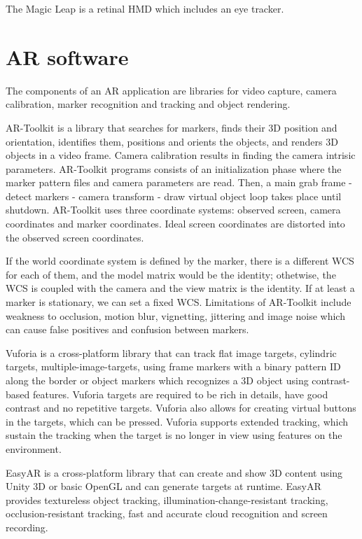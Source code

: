 \documentclass[a4paper]{article}
\begin{document}
The Magic Leap is a retinal HMD which includes an eye tracker.

\section{AR software}

The components of an AR application are libraries for video capture, camera calibration, marker recognition and tracking and object rendering.

AR-Toolkit is a library that searches for markers, finds their 3D position and orientation, identifies them, positions and orients the objects, and renders 3D objects in a video frame. Camera calibration results in finding the camera intrisic parameters.
AR-Toolkit programs consists of an initialization phase where the marker pattern files and camera parameters are read.
Then, a main grab frame - detect markers - camera transform - draw virtual object loop takes place until shutdown.
AR-Toolkit uses three coordinate systems: observed screen, camera coordinates and marker coordinates. Ideal screen coordinates are distorted into the observed screen coordinates.

If the world coordinate system is defined by the marker, there is a different WCS for each of them, and the model matrix would be the identity; othetwise, the WCS is coupled with the camera and the view matrix is the identity.
If at least a marker is stationary, we can set a fixed WCS.
Limitations of AR-Toolkit include weakness to occlusion, motion blur, vignetting, jittering and image noise which can cause false positives and confusion between markers.

Vuforia is a cross-platform library that can track flat image targets, cylindric targets, multiple-image-targets, using frame markers with a binary pattern ID along the border or object markers which recognizes a 3D object using contrast-based features. Vuforia targets are required to be rich in details, have good contrast and no repetitive targets.
Vuforia also allows for creating virtual buttons in the targets, which can be pressed.
Vuforia supports extended tracking, which sustain the tracking when the target is no longer in view using features on the environment.

EasyAR is a cross-platform library that can create and show 3D content using Unity 3D or basic OpenGL and can generate targets at runtime.
EasyAR provides textureless object tracking, illumination-change-resistant tracking, occlusion-resistant tracking, fast and accurate cloud recognition and screen recording.
\end{document}
